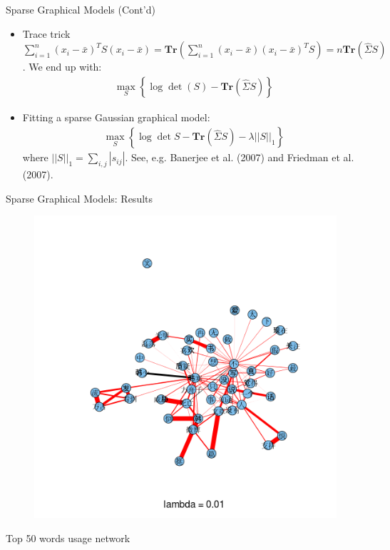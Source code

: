 \documentclass[12pt, trans]{beamer}
\newcommand{\1}[1]{{\mathbf 1}\left\{#1\right\}}        %
\def\lp{\left(}
\def\rp{\right)}
\begin{document}
\begin{frame}[fragile]{Sparse Graphical Models (Cont'd)}

\begin{itemize}[<+->]
\item  Trace trick $\sum_{i=1}^n(x_i-\bar{x})^T S (x_i-\bar{x}) = \textbf{Tr} (\sum_{i=1}^n (x_i-\bar{x})(x_i-\bar{x})^TS) = n\textbf{Tr}(\hat{\Sigma}S)$. We end up with:
\begin{align*}
\max_S \left\{  \log \det \lp S\rp - \textbf{Tr}(\hat{\Sigma}S )  \right\}
\end{align*}

\item  Fitting a sparse Gaussian graphical model:
\begin{align*}
\max_S \left\{ \log \det S - \textbf{Tr} ( \hat{\Sigma}S ) - \lambda ||S||_1 \right\}
\end{align*}
where $||S||_1 = \sum_{i,j}|s_{ij}|$. See, e.g. Banerjee et al. (2007) and Friedman et al. (2007). 

\end{itemize}

\end{frame}

\begin{frame}{Sparse Graphical Models: Results}

\begin{figure}
  \centering
  \includegraphics[height=0.9\textheight]{./../../gLassoResults/glasso1.png} 
\end{figure}
\center Top 50 words usage network
\end{frame}
\end{document}
